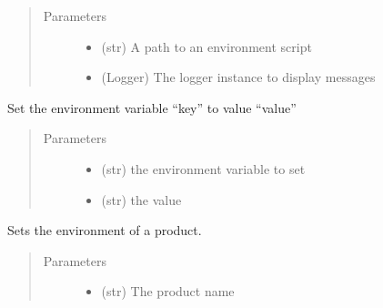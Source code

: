 \documentclass[a4paper,10pt,english]{sphinxmanual}
\begin{document}
\begin{fulllineitems}
\begin{fulllineitems}
\begin{description}
\end{description}
\begin{quote}\begin{description}
\item[{Parameters}] \leavevmode\begin{itemize}
\item {} 
 \textendash{} (str) A path to an environment script

\item {} 
 \textendash{} (Logger) The logger instance to display messages

\end{itemize}

\end{description}\end{quote}

\end{fulllineitems}


\begin{fulllineitems}
\label{\detokenize{apidoc_src/src:src.environment.SalomeEnviron.set}}
Set the environment variable “key” to value “value”
\begin{quote}\begin{description}
\item[{Parameters}] \leavevmode\begin{itemize}
\item {} 
 \textendash{} (str) the environment variable to set

\item {} 
 \textendash{} (str) the value

\end{itemize}

\end{description}\end{quote}

\end{fulllineitems}


\begin{fulllineitems}
\label{\detokenize{apidoc_src/src:src.environment.SalomeEnviron.set_a_product}}
Sets the environment of a product.
\begin{quote}\begin{description}
\item[{Parameters}] \leavevmode\begin{itemize}
\item {} 
 \textendash{} (str) The product name


\end{itemize}
\end{description}
\end{quote}
\end{fulllineitems}
\end{fulllineitems}
\end{document}
